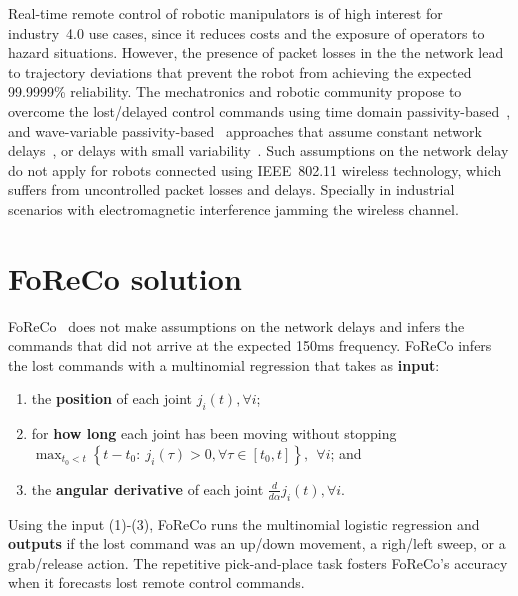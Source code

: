 \documentclass[a0,portrait]{a0poster}
\begin{document}
\begin{multicols}{2}
Real-time remote control of robotic manipulators is
of high interest for industry~4.0 use cases,
since it reduces costs and the exposure of
operators to hazard situations.
However, the presence of packet losses in
the the network lead to trajectory deviations
that prevent the robot from achieving
the expected 99.9999\% reliability.
The mechatronics and robotic community
propose to overcome the lost/delayed 
control commands using time domain
passivity-based~\cite{TDPC-3}, and
wave-variable passivity-based~\cite{wvbc-4}
approaches that assume constant
network delays~\cite{TDPC-5},
or delays with small 
variability~\cite{TDPC-3,wvbc-4}.
Such assumptions on the network delay
do not apply for robots connected using
IEEE~802.11 wireless technology,
which suffers from uncontrolled
packet losses and delays. Specially
in industrial scenarios with electromagnetic
interference jamming the wireless channel.






\color{DarkSlateGray} %



\section*{FoReCo solution}
\label{sec:foreco}

FoReCo~\cite{foreco} does not make assumptions on the network
delays and infers the commands that did not arrive
at the expected 150ms frequency.
FoReCo infers the lost commands with a
multinomial regression that takes as \textbf{input}:
\begin{enumerate}
    \item the \textbf{position} of each joint $j_i(t), \forall i$;
    \item for \textbf{how long} each joint has
    been moving without stopping\\
    $\max_{t_0<t}\left\{t-t_0:\ j_i(\tau)>0, \forall\tau\in[t_0,t]\right\},\ \ \forall i$; and
    \item the \textbf{angular derivative} of each joint $\tfrac{d}{d\alpha}j_i(t), \forall i$.
\end{enumerate}
Using the input (1)-(3),
FoReCo runs the multinomial logistic
regression and \textbf{outputs}
if the lost command
was an up/down movement,
a righ/left sweep, 
or a grab/release action.
The repetitive pick-and-place task
fosters FoReCo's accuracy
when it forecasts lost remote
control commands.




\end{multicols}
\end{document}

